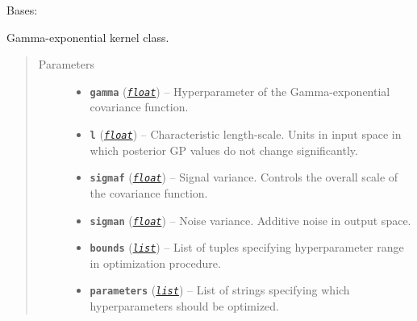 \documentclass[letterpaper,10pt,english]{sphinxmanual}
\begin{document}
\begin{fulllineitems}
\label{pyGPGO.covfunc:pyGPGO.covfunc.gammaExponential}
Bases: \href{https://docs.python.org/2/library/functions.html\#object}{}

Gamma-exponential kernel class.
\begin{quote}\begin{description}
\item[{Parameters}] \leavevmode\begin{itemize}
\item {} 
\textbf{\texttt{gamma}} (\href{https://docs.python.org/2/library/functions.html\#float}{\emph{\texttt{float}}}) -- Hyperparameter of the Gamma-exponential covariance function.

\item {} 
\textbf{\texttt{l}} (\href{https://docs.python.org/2/library/functions.html\#float}{\emph{\texttt{float}}}) -- Characteristic length-scale. Units in input space in which posterior GP values do not
change significantly.

\item {} 
\textbf{\texttt{sigmaf}} (\href{https://docs.python.org/2/library/functions.html\#float}{\emph{\texttt{float}}}) -- Signal variance. Controls the overall scale of the covariance function.

\item {} 
\textbf{\texttt{sigman}} (\href{https://docs.python.org/2/library/functions.html\#float}{\emph{\texttt{float}}}) -- Noise variance. Additive noise in output space.

\item {} 
\textbf{\texttt{bounds}} (\href{https://docs.python.org/2/library/functions.html\#list}{\emph{\texttt{list}}}) -- List of tuples specifying hyperparameter range in optimization procedure.

\item {} 
\textbf{\texttt{parameters}} (\href{https://docs.python.org/2/library/functions.html\#list}{\emph{\texttt{list}}}) -- List of strings specifying which hyperparameters should be optimized.

\end{itemize}

\end{description}\end{quote}


\end{fulllineitems}
\end{document}
